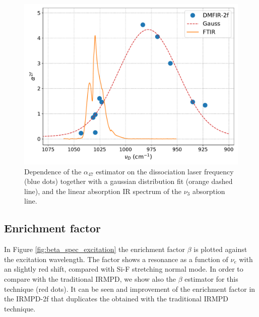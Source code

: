 \documentclass[global,twocolumn]{svjour}
\begin{document}
\begin{figure}[h]
	\centering
	\includegraphics[width = 1\linewidth]{figures/alfa_47_nu_diso.pdf}
	\caption{\label{fig:alfa_nu_diso} Dependence of the $\alpha_{47}$ estimator on the dissociation laser frequency (blue dots) together with a gaussian distribution fit (orange dashed line), and the linear absorption IR spectrum of the $\nu_{3}$ absorption line.}
\end{figure}

\subsection{Enrichment factor}
In Figure \ref{fig:beta_spec_excitation} the enrichment factor $\beta$ is plotted against the excitation wavelength. The factor shows a resonance as a function of $\nu_{e}$ with an slightly red shift, compared with Si-F stretching normal mode. In order to compare with the traditional IRMPD, we show also the $\beta$ estimator for this technique (red dots). It can be seen and improvement of the enrichment factor in the IRMPD-2f that duplicates the obtained with the traditional IRMPD technique.
\end{document}
